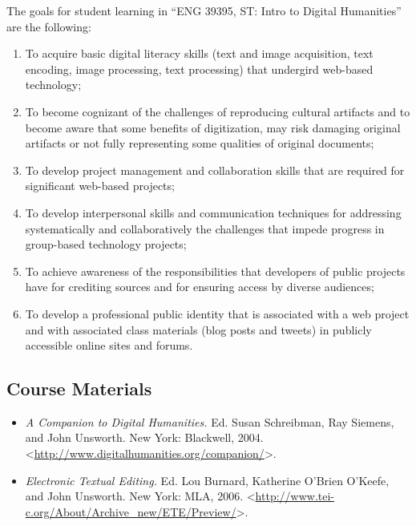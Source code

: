\documentclass[]{article}
\begin{document}
The goals for student learning in ``ENG 39395, ST: Intro to Digital
Humanities'' are the following:

\begin{enumerate}
\def\labelenumi{\arabic{enumi}.}
\itemsep1pt\parskip0pt
\item
  To acquire basic digital literacy skills (text and image acquisition,
  text encoding, image processing, text processing) that undergird
  web-based technology;
\item
  To become cognizant of the challenges of reproducing cultural
  artifacts and to become aware that some benefits of digitization, may
  risk damaging original artifacts or not fully representing some
  qualities of original documents;
\item
  To develop project management and collaboration skills that are
  required for significant web-based projects;
\item
  To develop interpersonal skills and communication techniques for
  addressing systematically and collaboratively the challenges that
  impede progress in group-based technology projects;
\item
  To achieve awareness of the responsibilities that developers of public
  projects have for crediting sources and for ensuring access by diverse
  audiences;
\item
  To develop a professional public identity that is associated with a
  web project and with associated class materials (blog posts and
  tweets) in publicly accessible online sites and forums.
\end{enumerate}

\subsection{Course Materials}\label{course-materials}

\begin{itemize}
\itemsep1pt\parskip0pt
\item
  \emph{A Companion to Digital Humanities.} Ed. Susan Schreibman, Ray
  Siemens, and John Unsworth. New York: Blackwell, 2004.
  \textless{}\url{http://www.digitalhumanities.org/companion/}\textgreater{}.
\item
  \emph{Electronic Textual Editing.} Ed. Lou Burnard, Katherine O'Brien
  O'Keefe, and John Unsworth. New York: MLA, 2006.
  \textless{}\url{http://www.tei-c.org/About/Archive_new/ETE/Preview/}\textgreater{}.
\end{itemize}
\end{document}
